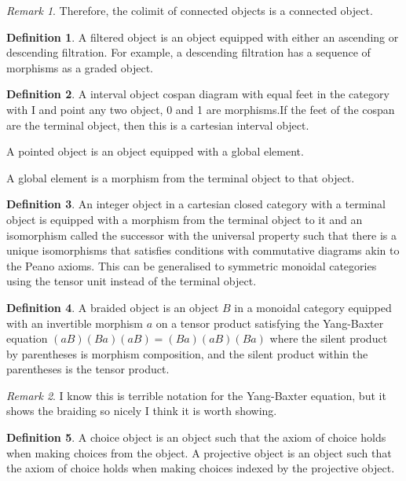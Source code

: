 \documentclass[10pt]{article}
\theoremstyle{plain}%
\theoremstyle{definition}
\newtheorem{definition}{Definition}[section]
\theoremstyle{remark}
\newtheorem*{remark}{Remark}
\begin{document}
\begin{remark}
    Therefore, the colimit of connected objects is a connected object.
\end{remark}

\begin{definition}
    A filtered object is an object equipped with either an ascending or descending filtration. For example, a descending filtration has a sequence of morphisms as a graded object.
\end{definition}

\begin{definition}
    A interval object cospan diagram with equal feet in the category with I and point any two object, 0 and 1 are morphisms.If the feet of the cospan are the terminal object, then this is a cartesian interval object.

    A pointed object is an object equipped with a global element.

    A global element is a morphism from the terminal object to that object.
\end{definition}

\begin{definition}
    An integer object in a cartesian closed category with a terminal object is equipped with a morphism from the terminal object to it and an isomorphism called the successor with the universal property such that there is a unique isomorphisms that satisfies conditions with commutative diagrams akin to the Peano axioms. This can be generalised to symmetric monoidal categories using the tensor unit instead of the terminal object.
\end{definition}

\begin{definition}
    A braided object is an object $B$ in a monoidal category equipped with an invertible morphism $a$ on a tensor product satisfying the Yang-Baxter equation $(a B)(B a)(a B) = (B a)(a B)(B a)$ where the silent product by parentheses is morphism composition, and the silent product within the parentheses is the tensor product.
\end{definition}

\begin{remark}
    I know this is terrible notation for the Yang-Baxter equation, but it shows the braiding so nicely I think it is worth showing.
\end{remark}

\begin{definition}
    A choice object is an object such that the axiom of choice holds when making choices from the object. A projective object is an object such that the axiom of choice holds when making choices indexed by the projective object.
\end{definition}
\end{document}
